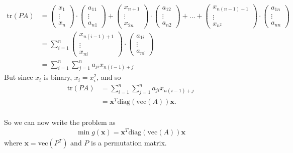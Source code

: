 \documentclass{article}
\begin{document}
\begin{align*}
    \text{tr} (PA) &= \begin{pmatrix}
        x_1 \\
        \vdots \\
        x_n
    \end{pmatrix} \cdot \begin{pmatrix}
        a_{11}\\
        \vdots \\
        a_{n1}
    \end{pmatrix} + \begin{pmatrix}
        x_{n+1} \\
        \vdots \\
        x_{2n}
    \end{pmatrix} \cdot \begin{pmatrix}
        a_{12}\\
        \vdots \\
        a_{n2}
    \end{pmatrix} + \hdots + \begin{pmatrix}
        x_{n(n-1) + 1} \\
        \vdots \\
        x_{n^2}
    \end{pmatrix} \cdot \begin{pmatrix}
        a_{1n}\\
        \vdots \\
        a_{nn}
    \end{pmatrix} \\
    &= \sum_{i=1}^{n} \begin{pmatrix}
        x_{n(i-1) + 1} \\
        \vdots \\
        x_{ni}
    \end{pmatrix} \cdot \begin{pmatrix}
        a_{1i} \\
        \vdots \\
        a_{ni}
    \end{pmatrix} \\
    &= \sum_{i=1}^{n} \sum_{j=1}^{n} a_{ji}x_{n(i-1)+j}
\end{align*}
But since \(x_i\) is binary, \(x_i = x_i^2\), and so 
\begin{align*}
    \text{tr}(PA) &= \sum_{i=1}^{n} \sum_{j=1}^{n} a_{ji}x_{n(i-1)+j} \\
    &= \mathbf{x}^T \text{diag}(\text{vec}(A))\mathbf{x}.
\end{align*}\\
\noindent So we can now write the problem as 
\begin{align} \label{Ex:LinAss 1}
    \min g(\mathbf{x}) = \mathbf{x}^T \text{diag}(\text{vec}(A)) \mathbf{x}
\end{align}
where \(\mathbf{x} = \text{vec}(P^T)\) and \(P\) is a permutation matrix.\\
\end{document}
